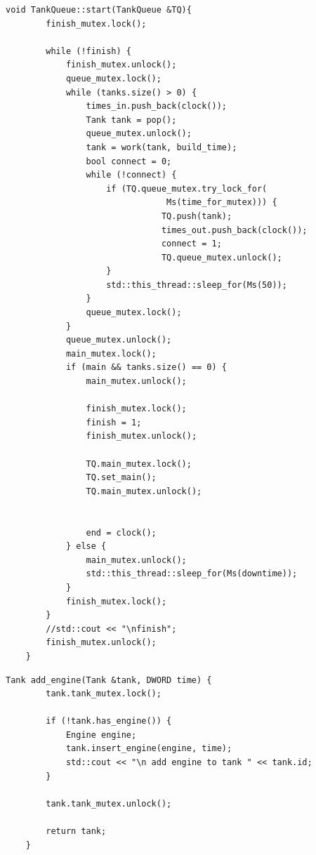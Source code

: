 \documentclass[a4paper, 14pt]{article}
\begin{document}
 \begin{lstlisting}[label=code:start,caption=Функция start.]
   void TankQueue::start(TankQueue &TQ){
        finish_mutex.lock();
    
        while (!finish) {
            finish_mutex.unlock();
            queue_mutex.lock();
            while (tanks.size() > 0) {
                times_in.push_back(clock());
                Tank tank = pop();
                queue_mutex.unlock();
                tank = work(tank, build_time);
                bool connect = 0;
                while (!connect) {
                    if (TQ.queue_mutex.try_lock_for(
                                Ms(time_for_mutex))) {
                               TQ.push(tank);
                               times_out.push_back(clock());
                               connect = 1;
                               TQ.queue_mutex.unlock();
                    }
                    std::this_thread::sleep_for(Ms(50));
                }
                queue_mutex.lock();
            }
            queue_mutex.unlock();
            main_mutex.lock();
            if (main && tanks.size() == 0) {
                main_mutex.unlock();
    
                finish_mutex.lock();
                finish = 1;
                finish_mutex.unlock();
    
                TQ.main_mutex.lock();
                TQ.set_main();
                TQ.main_mutex.unlock();
    
    
                end = clock();
            } else {
                main_mutex.unlock();
                std::this_thread::sleep_for(Ms(downtime));
            }
            finish_mutex.lock();
        }
        //std::cout << "\nfinish";
        finish_mutex.unlock();
    }
	\end{lstlisting}
	
	 \begin{lstlisting}[label=code:add_engine,caption=Функция add\_engine - встроить двигатель.]
   Tank add_engine(Tank &tank, DWORD time) {
        tank.tank_mutex.lock();
    
        if (!tank.has_engine()) {
            Engine engine;
            tank.insert_engine(engine, time);
            std::cout << "\n add engine to tank " << tank.id;
        }
    
        tank.tank_mutex.unlock();
    
        return tank;
    }
	\end{lstlisting}
	
\end{document}
